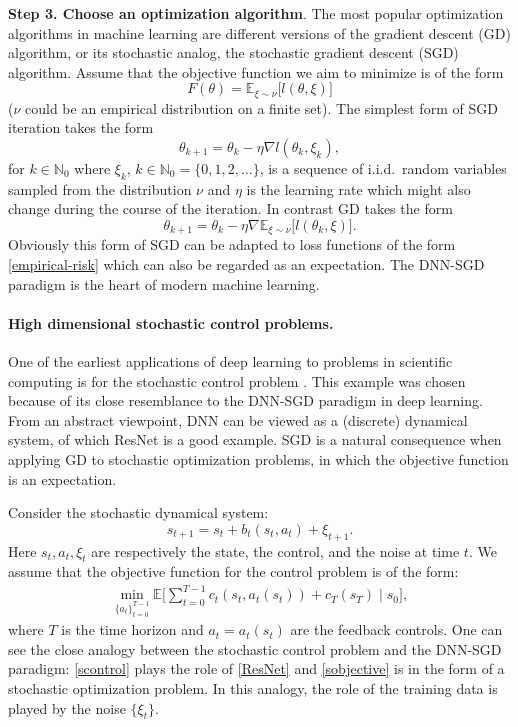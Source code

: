 \documentclass[12pt,AutoFakeBold,AutoFakeSlant]{article}
\theoremstyle{definition}
\newcommand{\E}{\mathbb{E}}
\newcommand{\N}{\mathbb{N}}
\begin{document}
	{\bf Step 3. Choose an optimization algorithm}.  
	The most popular optimization algorithms in machine learning are different versions of
	the gradient descent (GD) algorithm, or its stochastic analog, the
	stochastic gradient descent (SGD) algorithm. Assume that the objective function we aim to minimize is of the form
	\begin{equation}
	F(\theta) = \E_{\xi \sim \nu}\big[ l(\theta, \xi) \big]
	\label{expectation}
	\end{equation}
	($\nu$ could be an empirical distribution on a finite set). 
	The simplest form of SGD iteration takes the form 
	\begin{equation}
	\theta_{k+1} = \theta_k - \eta \nabla l(\theta_k, \xi_k),
	\end{equation}
	for $ k \in \N_0 $ where $ \xi_k $, $ k \in \N_0 = \{ 0, 1, 2, \dots \} $, is a sequence of 
	i.i.d.\ random variables sampled from the distribution $ \nu $ 
	and $ \eta $ is the learning rate which might also change during the course of the iteration.
	In contrast GD takes the form
	\begin{equation}
	\theta_{k+1} = \theta_k - \eta \nabla \E_{\xi \sim \nu}\big[ l(\theta_k, \xi) \big].
	\end{equation}
	Obviously this form of SGD can be adapted to loss functions of the form \eqref{empirical-risk} which can also be
	regarded as an expectation.
	The DNN-SGD paradigm is the heart of modern machine learning.

	\paragraph{High dimensional stochastic control problems.}

	One of the earliest applications of deep learning to problems in scientific computing is 
	for the stochastic control problem \cite{HanE2016deepcontrol}.
	This example was chosen because of its close resemblance to the DNN-SGD paradigm in deep learning.
	From an abstract viewpoint, DNN can be viewed as a (discrete) dynamical system, of which  ResNet is a good example.
	SGD is a natural consequence when applying GD to stochastic optimization problems, in which the objective function is an expectation.

	Consider the stochastic dynamical system:
	\begin{equation}
	s_{t +1} = s_t+b_t(s_t,a_t)+\xi_{t +1}.
	\label{scontrol}
	\end{equation}
	Here $s_t, a_t, \xi_t $ are respectively the  state, the control, and the noise at time $t$. 
	We assume that the objective function for the control problem is of the form:
	\begin{align}
	\min_{\{a_t\}_{t =0}^{T-1}}\mathbb{E}\Big[\sum_{t =0}^{T-1} c_t(s_t,a_t(s_t))+c_T(s_T)\mid s_0\Big],
	\label{sobjective}
	\end{align}
	where $T$ is the time horizon and  $a_t = a_t(s_t)$ are the feedback controls. 
	One can see  the close analogy between the stochastic
	control problem and the DNN-SGD paradigm:  \eqref{scontrol} plays the role of \eqref{ResNet} and \eqref{sobjective} is in the
	form of a stochastic optimization problem. In this analogy, the role of the training data is played by the noise $\{\xi_t\}$.
\end{document}
